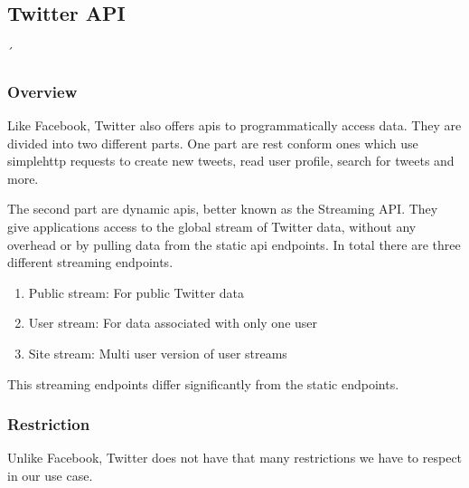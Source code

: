 \documentclass[11pt,titlepage,oneside,openany]{book}
\begin{document}
\subsection{Twitter API}´
\label{subsec:twapi}


\subsubsection{Overview}
\label{subsub:twoverview}


Like Facebook, Twitter also offers \acrshort{api}s to programmatically access data. They are divided into two different parts. One part are \acrfull{rest} conform ones which use simple\acrshort{http} requests to create new tweets, read user profile, search for tweets and more.
\par
\noindent The second part are dynamic \acrshort{api}s, better known as the Streaming API. They give applications access to the global stream of Twitter data, without any overhead or by pulling data from the static \acrshort{api} endpoints. In total there are three different streaming endpoints.

\begin{enumerate}
   \item Public stream: For public Twitter data
   \item User stream: For data associated with only one user
   \item Site stream: Multi user version of user streams
\end{enumerate}

This streaming endpoints differ significantly from the static endpoints. 

\subsubsection{Restriction}
\label{subsub:twrestrictions}

Unlike Facebook, Twitter does not have that many restrictions we have to respect in our use case.
\end{document}
